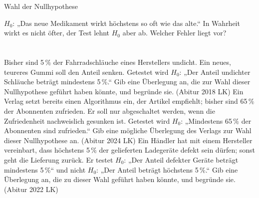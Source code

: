 \setcounter{aufgabe}{10}

\begin{aufgabe}{Wahl der Nullhypothese}
\begin{teile}
\teil $H_0$: „Das neue Medikament wirkt höchstens so oft wie das alte.“ In Wahrheit wirkt es nicht öfter, der Test lehnt $H_0$ aber ab. Welcher Fehler liegt vor? \\  \\  \\ 
\teil Bisher sind 5\,\% der Fahrradschläuche eines Herstellers undicht. Ein neues, teureres Gummi soll den Anteil senken. Getestet wird $H_0$: „Der Anteil undichter Schläuche beträgt mindestens 5\,\%.“ Gib eine Überlegung an, die zur Wahl dieser Nullhypothese geführt haben könnte, und begründe sie. \hfill (Abitur 2018 LK)
\teil Ein Verlag setzt bereits einen Algorithmus ein, der Artikel empfiehlt; bisher sind 65\,\% der Abonnenten zufrieden. Er soll nur abgeschaltet werden, wenn die Zufriedenheit nachweislich gesunken ist. Getestet wird $H_0$: „Mindestens 65\,\% der Abonnenten sind zufrieden.“ Gib eine mögliche Überlegung des Verlags zur Wahl dieser Nullhypothese an. \hfill (Abitur 2024 LK)
\teil Ein Händler hat mit einem Hersteller vereinbart, dass höchstens 5\,\% der gelieferten Ladegeräte defekt sein dürfen; sonst geht die Lieferung zurück. Er testet $H_0$: „Der Anteil defekter Geräte beträgt mindestens 5\,\%“ und nicht $H_0$: „Der Anteil beträgt höchstens 5\,\%.“ Gib eine Überlegung an, die zu dieser Wahl geführt haben könnte, und begründe sie. \hfill (Abitur 2022 LK)
\end{teile}
\end{aufgabe}

